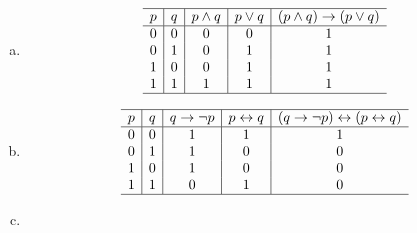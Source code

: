 {{\begin{practices}
\begin{enumerate}[a)]
{\begin{table}[H]
\[\begin{array}{c|c|c|c}
                                1 & 1 & 1 & 0 \\
                                \hline
                            \end{array}
                        \]
                    \end{table}
                }
                \item
                {
                    \begin{table}[H]
                        \[
                            \begin{array}{c|c|c|c|c}
                                \hline
                                p & q & p \wedge q & p \vee q & (p \wedge q) \rightarrow (p \vee q)\\
                                \hline
                                0 & 0 & 0 & 0 & 1 \\
                                0 & 1 & 0 & 1 & 1 \\
                                1 & 0 & 0 & 1 & 1 \\
                                1 & 1 & 1 & 1 & 1 \\
                                \hline
                            \end{array}
                        \]
                    \end{table}
                }
                \item
                {
                    \begin{table}[H]
                        \[
                            \begin{array}{c|c|c|c|c}
                                \hline
                                p & q & q \rightarrow \neg p & p \leftrightarrow q & (q \rightarrow \neg p) \leftrightarrow (p \leftrightarrow q)\\
                                \hline
                                0 & 0 & 1 & 1 & 1 \\
                                0 & 1 & 1 & 0 & 0 \\
                                1 & 0 & 1 & 0 & 0 \\
                                1 & 1 & 0 & 1 & 0 \\
                                \hline
                            \end{array}
                        \]
                    \end{table}
                }
                \item

\end{enumerate}
\end{practices}}}
